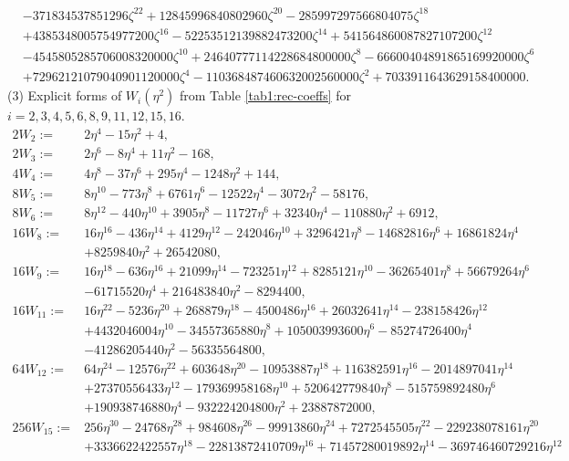 \documentclass[11pt,a4paper]{article}
\numberwithin{equation}{section}
\begin{document}
{\begin{appendices}
\begin{align*}
&-371834537851296 \zeta ^{22}+12845996840802960 \zeta ^{20}-285997297566804075 \zeta ^{18}\nonumber\\
&+4385348005754977200 \zeta ^{16}-52253512139882473200 \zeta ^{14}+541564860087827107200 \zeta ^{12}\nonumber\\
&-4545805285706008320000 \zeta ^{10}+24640777114228684800000 \zeta ^8-66600404891865169920000 \zeta ^6\nonumber\\
&+72962121079040901120000 \zeta ^4-110368487460632002560000 \zeta ^2+7033911643629158400000.
\end{align*}
(3) Explicit forms of $W_i(\eta^2)$ from Table \ref{tab1:rec-coeffs} for $i=2,3,4,5,6,8,9,11,12,15,16$.
\begin{align*}
2W_2:=	&2\eta^4-15\eta^2+4,\\
2W_3:=	 &2\eta^6-8\eta^4+11\eta^2-168,\\
4W_4:=	 &4\eta^8-37\eta^6+295\eta^4-1248\eta^2+144,\\
8W_{5}:=&8\eta^{10}-773\eta^8+6761\eta^6-12522\eta^4-3072\eta^2-58176,\\
8W_{6}:=&8\eta^{12}-440\eta^{10}+3905\eta^8-11727\eta^6+32340\eta^4-110880\eta^2+6912,\\
16W_{8}:=&16\eta^{16}-436\eta^{14}+4129\eta^{12}-242046\eta^{10}+3296421\eta^8-14682816\eta^6+16861824\eta^4\\
&+8259840\eta^2+26542080,\\
16W_{9}:=&16\eta^{18}-636 \eta^{16}+21099\eta^{14}-723251\eta^{12}+8285121\eta^{10}-36265401\eta^8+56679264\eta^6\\
&-61715520\eta^4+216483840\eta^2-8294400,\\
16W_{11}:=&16\eta^{22}-5236\eta^{20}+268879\eta^{18}-4500486 \eta^{16}+26032641\eta^{14}-238158426\eta^{12}\\
&+4432046004\eta^{10}-34557365880\eta^8+105003993600\eta^6-85274726400\eta^4\\
&-41286205440\eta^2-56335564800,\\
64W_{12}:=&64\eta^{24}-12576\eta^{22}+603648\eta^{20}-10953887\eta^{18}+116382591\eta^{16}-2014897041\eta^{14}\\
&+27370556433\eta^{12}-179369958168\eta^{10}+520642779840\eta^8-515759892480\eta^6\\
&+190938746880\eta^4-932224204800\eta^2+23887872000,\\
256W_{15}:=&256\eta^{30}-24768\eta^{28}+984608\eta^{26}-99913860\eta^{24}+7272545505\eta^{22}-229238078161\eta^{20}\\
&+3336622422557\eta^{18}-22813872410709\eta^{16}+71457280019892\eta^{14}-369746460729216\eta^{12}\\

\end{align*}
\end{appendices}}
\end{document}
